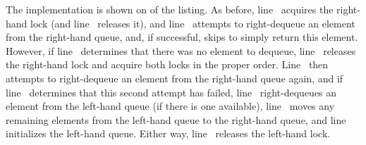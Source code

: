 \begin{fcvref}
The  implementation is shown on 
of the listing.
As before, line~ acquires the right-hand lock
(and line~
releases it), and line~ attempts to right-dequeue an element
from the right-hand queue, and, if successful,
skips 
to simply return this element.
However, if line~ determines that there was no element to dequeue,
line~ releases the right-hand lock and
 acquire both
locks in the proper order.
Line~ then attempts to right-dequeue an element
from the right-hand
queue again, and if line~ determines that this second attempt has
failed, line~ right-dequeues an element from the left-hand queue
(if there is one available), line~ moves any remaining elements
from the left-hand queue to the right-hand queue, and line~
initializes the left-hand queue.
Either way, line~ releases the left-hand lock.
\end{fcvref}

\fi

